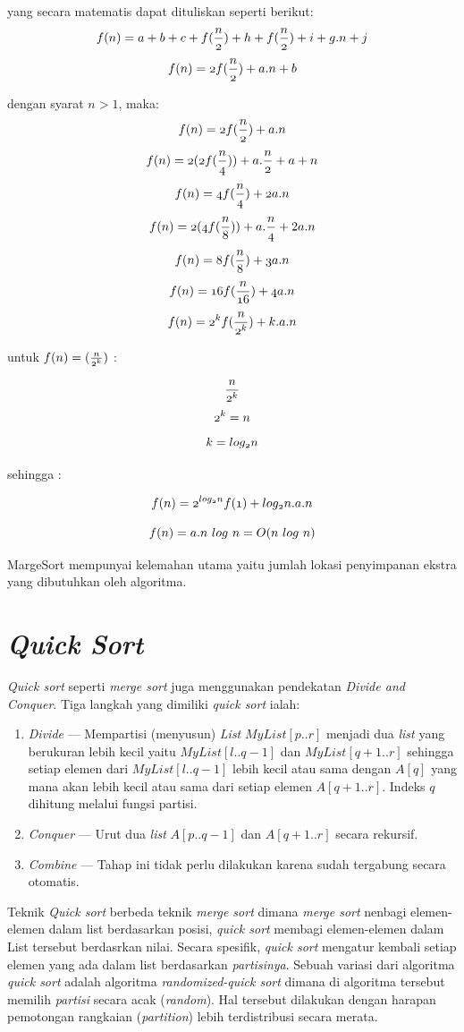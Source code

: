 \documentclass[12pt]{book}%
\begin{document}
yang secara matematis dapat dituliskan seperti berikut:
$$	  \mathnormal{f(n) = a+b+c+f(\frac{n}{2})+h+f(\frac{n}{2})+i+g.n+j } $$
$$	  \mathnormal{f(n) = 2f(\frac{n}{2})+a.n + b} $$

dengan syarat $n > 1$, maka:
$$	  \mathnormal{f(n) = 2f(\frac{n}{2})+a.n } $$
$$	  \mathnormal{f(n) = 2(2f(\frac{n}{4}))+a.\frac{n}{2} } + a+n $$
$$	  \mathnormal{f(n) = 4f(\frac{n}{4})+2a.n } $$
$$	  \mathnormal{f(n) = 2(4f(\frac{n}{8}))+a.\frac{n}{4} }+2a.n $$
$$	  \mathnormal{f(n) = 8f(\frac{n}{8})+3a.n } $$
$$	  \mathnormal{f(n) = 16f(\frac{n}{16})+4a.n } $$
$$	  \mathnormal{f(n) = 2^{k}f(\frac{n}{2^{k}})+k.a.n } $$

untuk $ \mathnormal{f(n) = (\frac{n}{2^{k}})} $ :

$$ \mathnormal{\frac{n}{2^{k}}} $$
$$ \mathnormal{2^{k}=n} $$
$$ \mathnormal{k=log_{2}n} $$

sehingga :

$$	  \mathnormal{f(n) = 2^{log_{2}n}f(1)+log_{2}n.a.n } $$

$$	  \mathnormal{f(n) = a.n\ log\ n = O(n\ log\ n)} $$

MargeSort mempunyai kelemahan utama yaitu jumlah lokasi penyimpanan ekstra yang dibutuhkan oleh algoritma.
 
\section{\textit{Quick Sort}}

\textit{Quick sort} seperti \textit{merge sort} juga menggunakan pendekatan \textit{Divide and Conquer}. Tiga langkah yang dimiliki \textit{quick sort} ialah:
\begin{enumerate}
	\item \textit{Divide} --- Mempartisi (menyusun) \textit{List} $MyList[p..r]$ menjadi dua \textit{list} yang berukuran lebih kecil yaitu $MyList[l..q-1]$ dan $MyList[q+1..r]$ sehingga setiap elemen dari $MyList[l..q-1]$ lebih kecil atau sama dengan $A[q]$ yang mana akan lebih kecil atau sama dari setiap elemen $A[q+1..r]$. Indeks $q$ dihitung melalui fungsi partisi.
	\item \textit{Conquer} --- Urut dua \textit{list} $A[p..q-1]$ dan $A[q+1..r]$ secara rekursif.
	\item \textit{Combine} --- Tahap ini tidak perlu dilakukan karena sudah tergabung secara otomatis.
\end{enumerate}

Teknik \textit{Quick sort} berbeda teknik \textit{merge sort} dimana \textit{merge sort} nenbagi elemen-elemen dalam list berdasarkan posisi, \textit{quick sort} membagi elemen-elemen dalam List tersebut berdasrkan nilai. Secara spesifik, \textit{quick sort} mengatur kembali setiap elemen yang ada dalam list berdasarkan \emph{partisinya}. Sebuah variasi dari algoritma \textit{quick sort} adalah algoritma \textit{randomized-quick sort} dimana di algoritma tersebut memilih \textit{partisi} secara acak (\textit{random}). Hal tersebut dilakukan dengan harapan pemotongan rangkaian (\textit{partition}) lebih terdistribusi secara merata.
\end{document}

